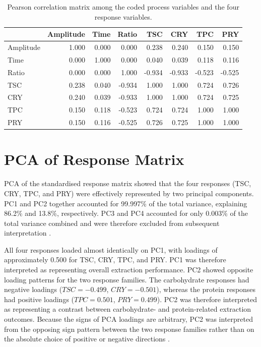 \documentclass[MScDSA]{uccthesis}
\begin{document}
\begin{table}[H]
\centering
\caption{Pearson correlation matrix among the coded process variables and the four response variables.}
\label{tab:correlation_matrix}
\begin{tabular}{lrrrrrrr}
\toprule
\textbf{} & \textbf{Amplitude} & \textbf{Time} & \textbf{Ratio} & \textbf{TSC} & \textbf{CRY} & \textbf{TPC} & \textbf{PRY} \\
\midrule
Amplitude & 1.000 & 0.000 & 0.000 & 0.238 & 0.240 & 0.150 & 0.150 \\
Time & 0.000 & 1.000 & 0.000 & 0.040 & 0.039 & 0.118 & 0.116 \\
Ratio & 0.000 & 0.000 & 1.000 & -0.934 & -0.933 & -0.523 & -0.525 \\
TSC & 0.238 & 0.040 & -0.934 & 1.000 & 1.000 & 0.724 & 0.726 \\
CRY & 0.240 & 0.039 & -0.933 & 1.000 & 1.000 & 0.724 & 0.725 \\
TPC & 0.150 & 0.118 & -0.523 & 0.724 & 0.724 & 1.000 & 1.000 \\
PRY & 0.150 & 0.116 & -0.525 & 0.726 & 0.725 & 1.000 & 1.000 \\
\bottomrule
\end{tabular}
\end{table}

\section{PCA of Response Matrix}
\label{sec:pca}
PCA of the standardised response matrix showed that the four responses (TSC, CRY, TPC, and PRY) were effectively represented by two principal components. PC1 and PC2 together accounted for 99.997\% of the total variance, explaining 86.2\% and 13.8\%, respectively. PC3 and PC4 accounted for only 0.003\% of the total variance combined and were therefore excluded from subsequent interpretation \parencite{Jolliffe:2002}.

All four responses loaded almost identically on PC1, with loadings of approximately 0.500 for TSC, CRY, TPC, and PRY. PC1 was therefore interpreted as representing overall extraction performance. PC2 showed opposite loading patterns for the two response families. The carbohydrate responses had negative loadings ($TSC =-0.499$, $CRY=-0.501$), whereas the protein responses had positive loadings ($TPC=0.501$, $PRY=0.499$). PC2 was therefore interpreted as representing a contrast between carbohydrate- and protein-related extraction outcomes.
Because the signs of PCA loadings are arbitrary, PC2 was interpreted from the opposing sign pattern between the two response families rather than on the absolute choice of positive or negative directions \parencite{Jolliffe:2002}.
\end{document}
